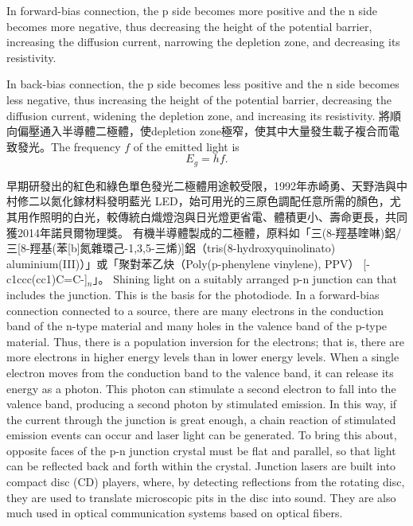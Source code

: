 \documentclass[a4paper,12pt]{article}
\begin{document}
In forward-bias connection, the p side becomes more positive and the n side becomes more negative, thus decreasing the height of the potential barrier, increasing the diffusion current, narrowing the depletion zone, and decreasing its resistivity.

In back-bias connection, the p side becomes less positive and the n side becomes less negative, thus increasing the height of the potential barrier, decreasing the diffusion current, widening the depletion zone, and increasing its resistivity.
將順向偏壓通入半導體二極體，使depletion zone極窄，使其中大量發生載子複合而電致發光。The frequency $f$ of the emitted light is
\[E_g=hf.\]

早期研發出的紅色和綠色單色發光二極體用途較受限，1992年赤崎勇、天野浩與中村修二以氮化鎵材料發明藍光 LED，始可用光的三原色調配任意所需的顏色，尤其用作照明的白光，較傳統白熾燈泡與日光燈更省電、體積更小、壽命更長，共同獲2014年諾貝爾物理獎。
有機半導體製成的二極體，原料如「三(8-羥基喹啉)鋁/三[8-羥基(苯[b]氮雜環己-1,3,5-三烯)]鋁（tris(8-hydroxyquinolinato) aluminium(III)）」或「聚對苯乙炔（Poly(p-phenylene vinylene), PPV） [-c1ccc(cc1)C=C-]$_n$」。
Shining light on a suitably arranged p-n junction can that includes the junction. This is the basis for the photodiode.
In a forward-bias connection connected to a source, there are many electrons in the conduction band of the n-type material and many holes in the valence band of the p-type  material. Thus, there is a population inversion for the electrons; that is, there are more electrons in higher energy levels than in lower energy levels. When a single electron moves from the conduction band to the valence band, it can release its energy as a photon. This photon can stimulate a second electron to fall into the valence band, producing a second photon by stimulated emission. In this way, if the current through the junction is great enough, a chain reaction of stimulated emission events can occur and laser light can be generated. To bring this about, opposite faces of the p-n junction crystal must be flat and parallel, so that light can be reflected back and forth within the crystal. Junction lasers are built into compact disc (CD) players, where, by detecting reflections from the rotating disc, they are used to translate microscopic pits in the disc into sound. They are also much used in optical communication systems based on optical fibers.
\end{document}
